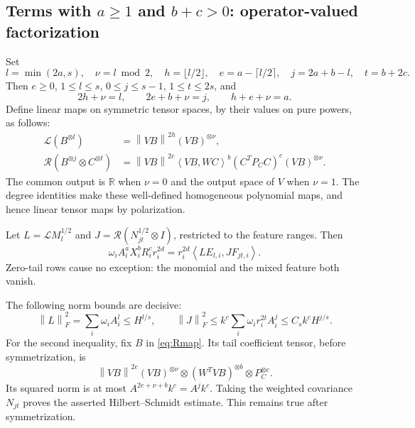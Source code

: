 \documentclass[11pt]{article}
\theoremstyle{remark}\newtheorem{remark}[theorem]{Remark}
\newcommand{\R}{\mathbb R}\newcommand{\E}{\mathbb E}\newcommand{\Prob}{\mathbb P}
\newcommand{\norm}[1]{\left\|#1\right\|}\newcommand{\ip}[2]{\left\langle #1,#2\right\rangle}
\begin{document}
\subsection[Positive head factors: operator-valued factorization]{Terms with $a\ge1$ and $b+c>0$: operator-valued factorization}\label{sub:operator}
Set
\begin{equation}\label{eq:indices}
 l=\min(2a,s),\quad \nu=l\bmod2,\quad h=\lfloor l/2\rfloor,\quad
 e=a-\lceil l/2\rceil,\quad j=2a+b-l,\quad t=b+2c.
\end{equation}
Then $e\ge0$, $1\le l\le s$, $0\le j\le s-1$, $1\le t\le2s$, and
\begin{equation}\label{eq:indices-identities}
 2h+\nu=l,\qquad 2e+b+\nu=j,\qquad h+e+\nu=a.
\end{equation}
Define linear maps on symmetric tensor spaces, by their values on pure powers, as follows:
\begin{align}
 \mathcal L(B^{\otimes l})&=\norm{VB}^{2h}(VB)^{\otimes\nu},\label{eq:Lmap}\\
 \mathcal R(B^{\otimes j}\otimes C^{\otimes t})
 &=\norm{VB}^{2e}\ip{VB}{WC}^{b}(C^TP_CC)^c(VB)^{\otimes\nu}.\label{eq:Rmap}
\end{align}
The common output is $\R$ when $\nu=0$ and the output space of $V$ when $\nu=1$. The degree identities make these well-defined homogeneous polynomial maps, and hence linear tensor maps by polarization.

Let $L=\mathcal L M_l^{1/2}$ and $J=\mathcal R(N_{jt}^{1/2}\otimes I)$, restricted to the feature ranges. Then
\begin{equation}\label{eq:op-factor}
 \omega_i A_i^aX_i^bR_i^cr_i^{2d}
 =r_i^{2d}\ip{L E_{l,i}}{J F_{jt,i}}.
\end{equation}
Zero-tail rows cause no exception: the monomial and the mixed feature both vanish.

The following norm bounds are decisive:
\begin{equation}\label{eq:query-maps}
 \norm L_F^2=\sum_i\omega_iA_i^l\le H^{l/s},\qquad
 \norm J_F^2\le k^c\sum_i\omega_i r_i^{2t}A_i^j\le C_s k^cH^{j/s}.
\end{equation}
For the second inequality, fix $B$ in \eqref{eq:Rmap}. Its tail coefficient tensor, before symmetrization, is
\[
 \norm{VB}^{2e}(VB)^{\otimes\nu}\otimes(W^TVB)^{\otimes b}\otimes P_C^{\otimes c}.
\]
Its squared norm is at most $A^{2e+\nu+b}k^c=A^jk^c$. Taking the weighted covariance $N_{jt}$ proves the asserted Hilbert--Schmidt estimate. This remains true after symmetrization.
\end{document}
